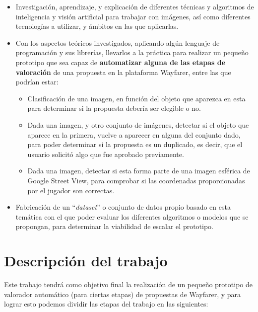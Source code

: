 \documentclass[12pt]{article}
\begin{document}
		\begin{itemize}
			\item Investigación, aprendizaje, y explicación de diferentes técnicas y algoritmos de inteligencia y visión artificial para trabajar con imágenes, así como diferentes tecnologías a utilizar, y ámbitos en las que aplicarlas. 
			
			\item Con los aspectos teóricos investigados, aplicando algún lenguaje de programación y sus librerías, llevarlos a la práctica para realizar un pequeño prototipo que sea capaz de \textbf{automatizar alguna de las etapas de valoración} de una propuesta en la plataforma Wayfarer, entre las que podrían estar: 
			
			\begin{itemize}
				\item Clasificación de una imagen, en función del objeto que aparezca en esta para determinar si la propuesta debería ser elegible o no. 
				
				\item Dada una imagen, y otro conjunto de imágenes, detectar si el objeto que aparece en la primera, vuelve a aparecer en alguna del conjunto dado, para poder determinar si la propuesta es un duplicado, es decir, que el usuario solicitó algo que fue aprobado previamente. 
				
				\item Dada una imagen, detectar si esta forma parte de una imagen esférica de Google Street View, para comprobar si las coordenadas proporcionadas por el jugador son correctas. 
			\end{itemize}
			
			\item Fabricación de un ``\textit{dataset}'' o conjunto de datos propio basado en esta temática con el que poder evaluar los diferentes algoritmos o modelos que se propongan, para determinar la viabilidad de escalar el prototipo. 
		\end{itemize}
	
	\section{Descripción del trabajo}
	
		Este trabajo tendrá como objetivo final la realización de un pequeño prototipo de valorador automático (para ciertas etapas) de propuestas de Wayfarer, y para lograr esto podemos dividir las etapas del trabajo en las siguientes: 
		
\end{document}
